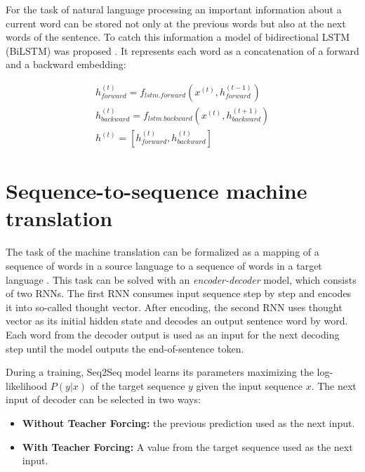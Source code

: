 For the task of natural language processing an important information about a current word can be stored not only at the previous words but also at the next words of the sentence. To catch this information a model of bidirectional LSTM (BiLSTM) was proposed  \parencite{schuster1997, graves2005}. It represents each word as a concatenation of a forward and a backward embedding:

\begin{equation}
\begin{gathered}
h_{forward}^{(t)} = f_{lstm.forward}(x^{(t)}, h^{(t-1)}_{forward}) \\
h_{backward}^{(t)} = f_{lstm.backward}(x^{(t)}, h^{(t+1)}_{backward}) \\

h^{(t)} = [h_{forward}^{(t)}, h_{backward}^{(t)} ]
\end{gathered}
\end{equation}

\section{Sequence-to-sequence machine translation} \label{seq2seq}
The task of the machine translation can be formalized as a mapping of a sequence of words in a source language to a sequence of words in a target language \parencite{Neubig2017}. This task can be solved with an \emph{encoder-decoder} model, which consists of two RNNs. The first RNN consumes input sequence step by step and encodes it into so-called thought vector. After encoding, the second RNN uses thought vector as its initial hidden state and decodes an output sentence word by word.  Each word from the decoder output is used as an input for the next decoding step until the model outputs the end-of-sentence token. 

During a training, Seq2Seq model learns its parameters maximizing the log-likelihood $P(y|x)$ of the target sequence $y$ given the input sequence $x$. The next input of decoder can be selected in two ways:
    \begin{itemize}
    	\item \textbf{Without Teacher Forcing:} the previous prediction used as the next input.
    	\item \textbf{With Teacher Forcing:} A value from the target sequence used as the next input.
    \end{itemize}


